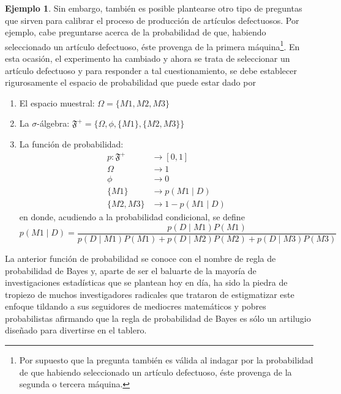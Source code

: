\documentclass[
  10pt,
  spanish,
]{book}
\providecommand{\tightlist}{%
  \setlength{\itemsep}{0pt}\setlength{\parskip}{0pt}}
\theoremstyle{definition}
\theoremstyle{definition}
\newtheorem{example}{Ejemplo}[chapter]
\theoremstyle{definition}
\theoremstyle{definition}
\theoremstyle{remark}
\begin{document}
\begin{example}
Sin embargo, también es posible plantearse otro tipo de preguntas que sirven para calibrar el proceso de producción de artículos defectuosos. Por ejemplo, cabe preguntarse acerca de la probabilidad de que, habiendo seleccionado un artículo defectuoso, éste provenga de la primera máquina\footnote{Por supuesto que la pregunta también es válida al indagar por la probabilidad de que habiendo seleccionado un artículo defectuoso, éste provenga de la segunda o tercera máquina.}. En esta ocasión, el experimento ha cambiado y ahora se trata de seleccionar un artículo defectuoso y para responder a tal cuestionamiento, se debe establecer rigurosamente el espacio de probabilidad que puede estar dado por

\begin{enumerate}
\def\labelenumi{\arabic{enumi}.}
\tightlist
\item
  El espacio muestral: \(\Omega=\{M1, M2, M3 \}\)
\item
  La \(\sigma\)-álgebra: \(\mathfrak{F}^+=\{\Omega, \phi, \{M1\}, \{M2,M3\}\}\)
\item
  La función de probabilidad:
  \begin{align*}
    p: \mathfrak{F}^+ &\longrightarrow [0,1]\\
    \Omega &\longrightarrow 1\\
    \phi &\longrightarrow 0\\
    \{M1\}&\longrightarrow p(M1 \mid D)\\
    \{M2,M3\}&\longrightarrow 1-p(M1 \mid D)
    \end{align*}
  en donde, acudiendo a la probabilidad condicional, se define
  \begin{equation*}
    p(M1 \mid D)=\frac{p(D \mid M1)P(M1)}{p(D \mid M1)P(M1)+p(D \mid M2)P(M2)+p(D \mid M3)P(M3)}
    \end{equation*}
\end{enumerate}

La anterior función de probabilidad se conoce con el nombre de regla de probabilidad de Bayes y, aparte de ser el baluarte de la mayoría de investigaciones estadísticas que se plantean hoy en día, ha sido la piedra de tropiezo de muchos investigadores radicales que trataron de estigmatizar este enfoque tildando a sus seguidores de mediocres matemáticos y pobres probabilistas afirmando que la regla de probabilidad de Bayes es sólo un artilugio diseñado para divertirse en el tablero.


\end{example}
\end{document}
